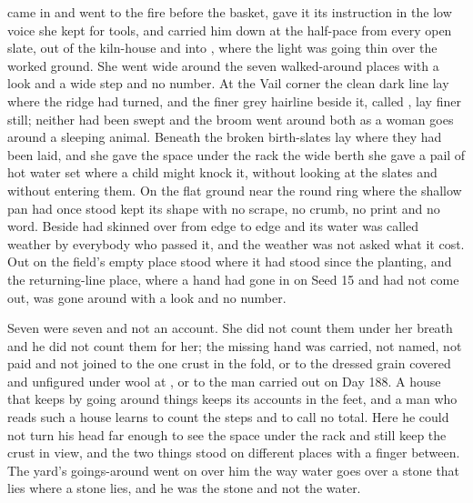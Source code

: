 \scenebreak

 came in and went to the fire before the basket, gave it its instruction in the low voice she kept for tools, and carried him down at the half-pace from every open slate, out of the kiln-house and into , where the light was going thin over the worked ground. She went wide around the seven walked-around places with a look and a wide step and no number. At the Vail corner the clean dark line lay where the  ridge had turned, and the finer grey hairline beside it, called , lay finer still; neither had been swept and the broom went around both as a woman goes around a sleeping animal. Beneath  the broken birth-slates lay where they had been laid, and she gave the space under the rack the wide berth she gave a pail of hot water set where a child might knock it, without looking at the slates and without entering them. On the flat ground near  the round ring where the shallow pan had once stood kept its shape with no scrape, no crumb, no print and no word. Beside   had skinned over from edge to edge and its water was called weather by everybody who passed it, and the weather was not asked what it cost. Out on  the field's empty place stood where it had stood since the planting, and the returning-line place, where a hand had gone in on Seed 15 and had not come out, was gone around with a look and no number.

Seven were seven and not an account. She did not count them under her breath and he did not count them for her; the missing hand was carried, not named, not paid and not joined to the one crust in the fold, or to the dressed grain covered and unfigured under wool at , or to the man carried out on Day 188. A house that keeps by going around things keeps its accounts in the feet, and a man who reads such a house learns to count the steps and to call no total. Here he could not turn his head far enough to see the space under the rack and still keep the crust in view, and the two things stood on different places with a finger between. The yard's goings-around went on over him the way water goes over a stone that lies where a stone lies, and he was the stone and not the water.

